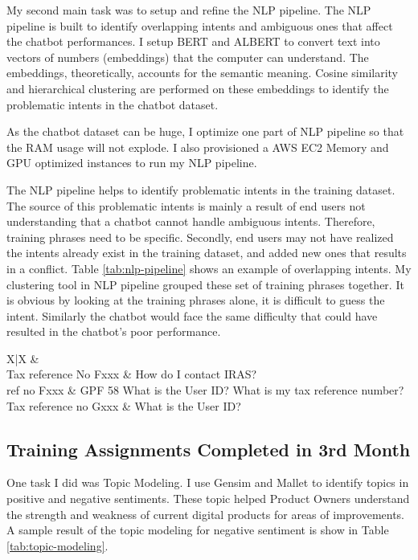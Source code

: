 \noindent
My second main task was to setup and refine the NLP pipeline. The NLP pipeline is built to identify overlapping intents and ambiguous ones that affect the chatbot performances. I setup BERT and ALBERT to convert text into vectors of numbers (embeddings) that the computer can understand. The embeddings, theoretically, accounts for the semantic meaning. Cosine similarity and hierarchical clustering are performed on these embeddings to identify the problematic intents in the chatbot dataset.

\noindent
As the chatbot dataset can be huge, I optimize one part of NLP pipeline so that the RAM usage will not explode. I also provisioned a AWS EC2 Memory and GPU optimized instances to run my NLP pipeline. 

\noindent
The NLP pipeline helps to identify problematic intents in the training dataset. The source of this problematic intents is mainly a result of end users not understanding that a chatbot cannot handle ambiguous intents. Therefore, training phrases need to be specific. Secondly, end users may not have realized the intents already exist in the training dataset, and added new ones that results in a conflict. Table \ref{tab:nlp-pipeline} shows an example of overlapping intents. My clustering tool in NLP pipeline grouped these set of training phrases together. It is obvious by looking at the training phrases alone, it is difficult to guess the intent. Similarly the chatbot would face the same difficulty that could have resulted in the chatbot's poor performance.

\begin{table}[h!]
	\caption{Sample results of NLP pipeline}
	\label{tab:nlp-pipeline}
	\begin{tabularx}{\textwidth}{X|X}
		 & \\
		\hline
		Tax reference No Fxxx & How do I contact IRAS? \\
		ref no Fxxx & GPF 58 What is the User ID? What is my tax reference number?\\
		Tax reference no Gxxx & What is the User ID?\\
	\end{tabularx}
\end{table}
\subsection{Training Assignments Completed in 3rd Month}
\noindent
One task I did was Topic Modeling. I use Gensim and Mallet to identify topics in positive and negative sentiments. These topic helped Product Owners understand the strength and weakness of current digital products for areas of improvements. A sample result of the topic modeling for negative sentiment is show in Table \ref{tab:topic-modeling}.

